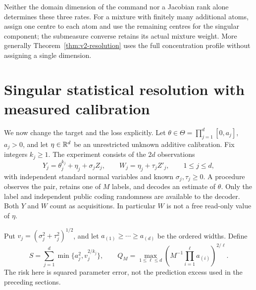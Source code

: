 Neither the domain dimension of the command nor a Jacobian rank alone
determines these three rates. For a mixture with finitely many additional
atoms, assign one centre to each atom and use the remaining centres for
the singular component; the submeasure converse retains its actual
mixture weight. More generally Theorem~\ref{thm:v2-resolution} uses the
full concentration profile without assigning a single dimension.

\section{Singular statistical resolution with measured calibration}
\label{sec:v2-statistics}
We now change the target and the loss explicitly. Let
$\theta\in\Theta=\prod_{j=1}^d[0,a_j]$, $a_j>0$, and let
$\eta\in\mathbb R^d$ be an unrestricted unknown additive calibration. Fix
integers $k_j\ge1$. The experiment consists of the $2d$ observations
\begin{equation}\label{eq:v2-paired}
 Y_j=\theta_j^{k_j}+\eta_j+\sigma_jZ_j,
 \qquad W_j=\eta_j+\tau_jZ'_j,
 \qquad 1\le j\le d,
\end{equation}
with independent standard normal variables and known
$\sigma_j,\tau_j\ge0$. A procedure observes the pair, retains one of
$M$ labels, and decodes an estimate of $\theta$. Only the label and
independent public coding randomness are available to the decoder.
Both $Y$ and $W$ count as acquisitions. In particular $W$ is not a free
read-only value of $\eta$.

Put $v_j=(\sigma_j^2+\tau_j^2)^{1/2}$, and let
$a_{(1)}\ge\cdots\ge a_{(d)}$ be the ordered widths. Define
\begin{equation}\label{eq:v2-statprofile}
 S=\sum_{j=1}^d\min\{a_j^2,v_j^{2/k_j}\},\qquad
 Q_M=\max_{1\le\ell\le d}
       \left(M^{-1}\prod_{i=1}^{\ell}a_{(i)}\right)^{2/\ell}.
\end{equation}
The risk here is squared parameter error, not the prediction excess used
in the preceding sections.

